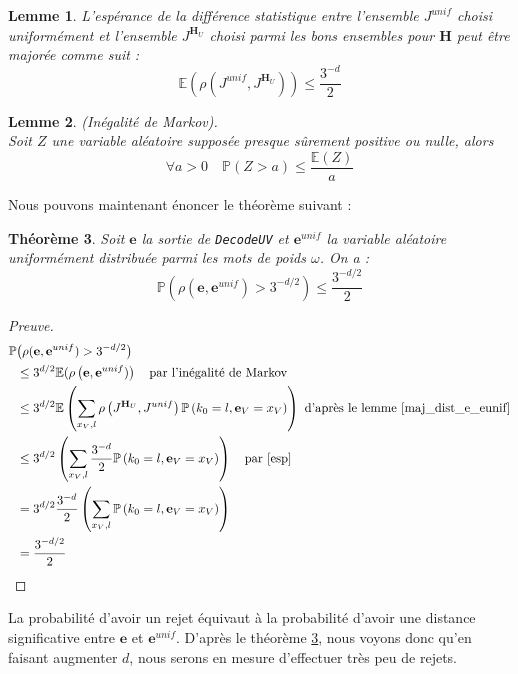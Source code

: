 \documentclass[12pt]{article}
\theoremstyle{plain}
\newtheorem{thm}{Théorème}[section]
\newtheorem{lemme}[thm]{Lemme}
\theoremstyle{definition}
\newcommand{\e}{\mathbf{e}}
\begin{document}
\begin{lemme}\label{esp}
L'espérance de la différence statistique entre l'ensemble $J^{unif}$ choisi uniformément et l'ensemble $J^{\mathbf{H}_U}$ choisi parmi les bons ensembles pour $\mathbf{H}$ peut être majorée comme suit :
$$ \mathbb{E}\left(\rho\left(J^{unif},J^{\mathbf{H}_U}\right)\right) \leq \frac{3^{-d}}{2} $$
\end{lemme}

\begin{lemme}\label{markov}(Inégalité de Markov).\\
Soit $Z$ une variable aléatoire supposée presque sûrement positive ou nulle, alors $$\forall a>0\quad \mathbb{P}(Z > a) \leq \frac{\mathbb{E}(Z)}{a}$$
\end{lemme}

\noindent Nous pouvons maintenant énoncer le théorème suivant :

\begin{thm}\label{rejet}
Soit $\e$ la sortie de \verb|DecodeUV| et $\e^{unif}$ la variable aléatoire uniformément distribuée parmi les mots de poids $\omega$. On a :
$$ \mathbb{P}\left(\rho(\e,\e^{unif})>3^{-d/2}\right) \leq \frac{3^{-d/2}}{2} $$
\end{thm}

\begin{proof}[Preuve]
\begin{equation*}
\begin{split}
\mathbb{P}&\big(\rho(\e,\e^{unif})>3^{-d/2}\big) \\
&\leq 3^{d/2}\mathbb{E}(\rho\left(\e,\e^{unif})\right) \quad \text{par l'inégalité de Markov}\\
&\leq 3^{d/2}\mathbb{E}\left(\sum\limits_{x_V,l} \rho\left(J^{\mathbf{H}_U},J^{unif}\right)\mathbb{P}\left(k_0 = l , \e_V = x_V\right)\right) \text{ d'après le lemme \ref{maj_dist_e_eunif}}\\
&\leq 3^{d/2}\left(\sum\limits_{x_V,l} \frac{3^{-d}}{2}\mathbb{P}\left(k_0 = l ,\e_V = x_V\right)\right) \quad \text{par \eqref{esp}}\\
&= 3^{d/2} \frac{3^{-d}}{2}\left(\sum\limits_{x_V,l}\mathbb{P}\left(k_0 = l ,\e_V = x_V\right)\right) \\
&= \frac{3^{-d/2}}{2}\\
\end{split}
\end{equation*}
\end{proof}


\noindent La probabilité d'avoir un rejet équivaut à la probabilité d'avoir une distance significative entre $\e$ et $\e^{unif}$. D'après le théorème \ref{rejet}, nous voyons donc qu'en faisant augmenter $d$, nous serons en mesure d'effectuer très peu de rejets.
\end{document}
